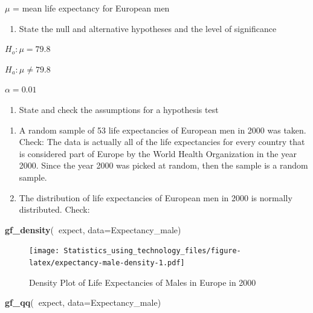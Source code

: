 \documentclass[
]{book}
\newenvironment{Shaded}{\begin{snugshade}}{\end{snugshade}}
\newcommand{\DataTypeTok}[1]{\textcolor[rgb]{0.13,0.29,0.53}{#1}}
\newcommand{\KeywordTok}[1]{\textcolor[rgb]{0.13,0.29,0.53}{\textbf{#1}}}
\newcommand{\NormalTok}[1]{#1}
\newcommand{\OperatorTok}[1]{\textcolor[rgb]{0.81,0.36,0.00}{\textbf{#1}}}
\providecommand{\tightlist}{%
  \setlength{\itemsep}{0pt}\setlength{\parskip}{0pt}}
\begin{document}
\(\mu\) = mean life expectancy for European men

\begin{enumerate}
\def\labelenumi{\arabic{enumi}.}
\setcounter{enumi}{1}
\tightlist
\item
  State the null and alternative hypotheses and the level of significance
\end{enumerate}

\(H_o:\mu=79.8\)

\(H_a:\mu\ne79.8\)

\(\alpha=0.01\)

\begin{enumerate}
\def\labelenumi{\arabic{enumi}.}
\setcounter{enumi}{2}
\tightlist
\item
  State and check the assumptions for a hypothesis test
\end{enumerate}

\begin{enumerate}
\def\labelenumi{\alph{enumi}.}
\item
  A random sample of 53 life expectancies of European men in 2000 was taken. Check: The data is actually all of the life expectancies for every country that is considered part of Europe by the World Health Organization in the year 2000. Since the year 2000 was picked at random, then the sample is a random sample.
\item
  The distribution of life expectancies of European men in 2000 is normally distributed. Check:
\end{enumerate}



\begin{Shaded}
\begin{Highlighting}[]
\KeywordTok{gf_density}\NormalTok{(}\OperatorTok{~}\NormalTok{expect, }\DataTypeTok{data=}\NormalTok{Expectancy_male)}
\end{Highlighting}
\end{Shaded}

\begin{figure}
\centering
\texttt{[image: Statistics\_using\_technology\_files/figure-latex/expectancy-male-density-1.pdf]}
\caption{\label{fig:expectancy-male-density}Density Plot of Life Expectancies of Males in Europe in 2000}
\end{figure}



\begin{Shaded}
\begin{Highlighting}[]
\KeywordTok{gf_qq}\NormalTok{(}\OperatorTok{~}\NormalTok{expect, }\DataTypeTok{data=}\NormalTok{Expectancy_male)}
\end{Highlighting}
\end{Shaded}
\end{document}
